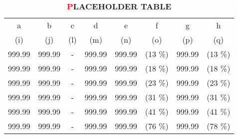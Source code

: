 \begin{table}
\centering
\begin{tabular}{c c c c c c c c}
\toprule
{a} & {b} & {c} & {d} & {e} & {f} & {g} & {h} \\
(i) & (j) & (l) & (m) & (n) & (o) & (p) & (q) \\
\midrule
999.99 & 999.99 & - & 999.99 & 999.99 & (13 \%) & 999.99 & (13 \%)\\
999.99 & 999.99 & - & 999.99 & 999.99 & (18 \%) & 999.99 & (18 \%)\\
999.99 & 999.99 & - & 999.99 & 999.99 & (23 \%) & 999.99 & (23 \%)\\
999.99 & 999.99 & - & 999.99 & 999.99 & (31 \%) & 999.99 & (31 \%)\\
999.99 & 999.99 & - & 999.99 & 999.99 & (41 \%) & 999.99 & (41 \%)\\
999.99 & 999.99 & - & 999.99 & 999.99 & (76 \%) & 999.99 & (78 \%)\\
\bottomrule
\end{tabular}
\caption{ \textbf{\textcolor{red}PLACEHOLDER TABLE}}
\label{tab:regtab}
\end{table}
